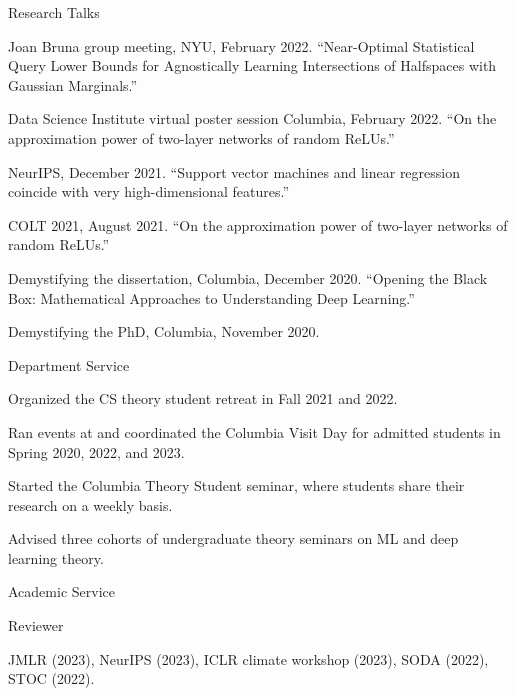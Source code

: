 \documentclass{cv} %
\begin{document}
\begin{rSection}{Research Talks}
\begin{rSubsection}{}{}{}
\item  Joan Bruna group meeting, NYU, February 2022. ``Near-Optimal Statistical Query Lower Bounds for Agnostically Learning Intersections of Halfspaces with Gaussian Marginals.''
\item  Data Science Institute virtual poster session Columbia, February 2022. ``On the approximation power of two-layer networks of random ReLUs.''
\item  NeurIPS, December 2021. ``Support vector machines and linear regression coincide with very high-dimensional features.''
\item COLT 2021, August 2021.  ``On the approximation power of two-layer networks of random ReLUs.''
\item Demystifying the dissertation, Columbia, December 2020. ``Opening the Black Box: Mathematical Approaches to Understanding Deep Learning.''
\item Demystifying the PhD, Columbia, November 2020. 

\end{rSubsection}
\end{rSection}

\begin{rSection}{Department Service}
\begin{rSubsection}{}{}{}

    \item Organized the CS theory student retreat in Fall 2021 and 2022.
    \item Ran events at and coordinated the Columbia Visit Day for admitted students in Spring 2020, 2022, and 2023.
    \item Started the Columbia Theory Student seminar, where students share their research on a weekly basis.
    \item Advised three cohorts of undergraduate theory seminars on ML and deep learning theory.
\end{rSubsection}
\end{rSection}

\begin{rSection}{Academic Service}
\begin{rSubsection}{Reviewer}{}{}

    \item JMLR (2023), NeurIPS (2023), ICLR climate workshop (2023), SODA (2022), STOC (2022).
\end{rSubsection}

\end{rSection}
\end{document}
